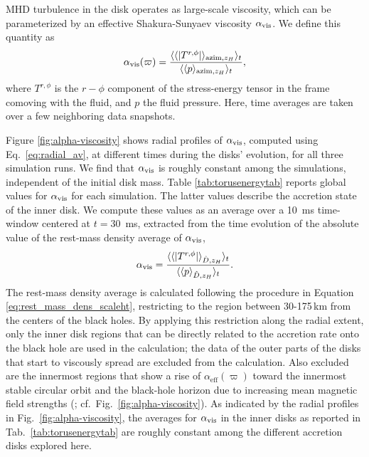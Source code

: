 MHD turbulence in the disk operates as large-scale viscosity, which can be parameterized by an effective Shakura-Sunyaev viscosity $\alpha_{\rm vis}$. We define this quantity as
\begin{equation}
    \alpha_{\rm vis} (\varpi) = \frac{\langle \langle |T^{r,\phi}|\rangle_{{\rm azim}, z_H}\rangle_t}{\langle \langle p \rangle_{{\rm azim}, z_H}\rangle_t}, \label{eq:alpha_visc_def_0D}
\end{equation}
where $T^{r,\phi}$ is the $r-\phi$ component of the stress-energy tensor in the frame comoving with the fluid, and $p$ the fluid pressure. Here, time averages are taken over a few neighboring data snapshots.

Figure \ref{fig:alpha-viscosity} shows radial profiles of $\alpha_{\rm vis}$, computed using Eq.~\eqref{eq:radial_av}, at different times during the disks' evolution, for all three simulation runs. We find that $\alpha_{\rm vis}$ is roughly constant among the simulations, independent of the initial disk mass. Table \ref{tab:torusenergytab} reports global values for $\alpha_{\rm vis}$ for each simulation. The latter values describe the accretion state of the inner disk. We compute these values as an average over a 10~ms time-window centered at $t = 30$~ms, extracted from the time evolution of the absolute value of the rest-mass density average of $\alpha_{\rm vis}$,
\begin{equation}
    \alpha_{\rm vis} = \frac{\langle \langle |T^{r,\phi}|\rangle_{\hat{D}, z_H}\rangle_t}{\langle \langle p \rangle_{\hat{D}, z_H}\rangle_t}. \label{eq:alpha_visc_def_1D}
\end{equation}
The rest-mass density average is calculated following the procedure in Equation \eqref{eq:rest_mass_dens_scaleht}, restricting to the region between 30-175\,km from the centers of the black holes. By applying this restriction along the radial extent, only the inner disk regions that can be directly related to the accretion rate onto the black hole are used in the calculation; the data of the outer parts of the disks that start to viscously spread are excluded from the calculation. Also excluded are the innermost regions that show a rise of $\alpha_\mathrm{eff}(\varpi)$ toward the innermost stable circular orbit and the black-hole horizon due to increasing mean magnetic field strengths (\cite{penna_shakura-sunyaev_2013}; cf.~Fig.~\ref{fig:alpha-viscosity}). As indicated by the radial profiles in Fig.~\ref{fig:alpha-viscosity}, the averages for $\alpha_{\rm vis}$ in the inner disks as reported in Tab.~\ref{tab:torusenergytab} are roughly constant among the different accretion disks explored here.

